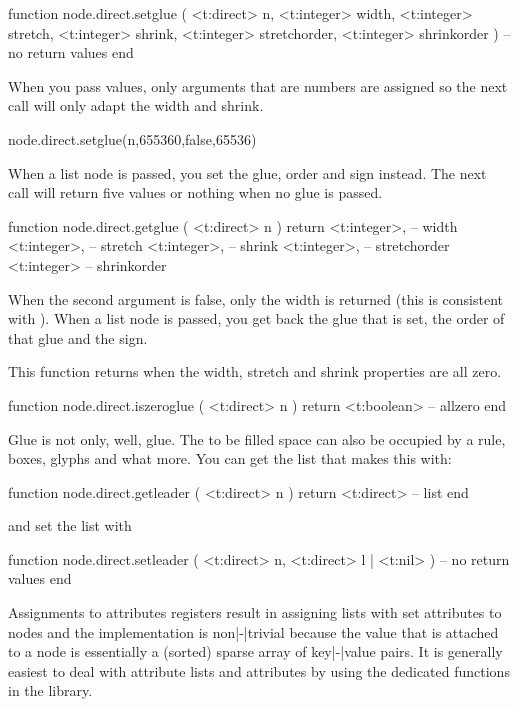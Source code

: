 function node.direct.setglue (
    <t:direct>  n,
    <t:integer> width,
    <t:integer> stretch,
    <t:integer> shrink,
    <t:integer> stretchorder,
    <t:integer> shrinkorder
)
    -- no return values
end
\stoptyping

When you pass values, only arguments that are numbers are assigned so the next
call will only adapt the width and shrink.

\starttyping[option=LUA]
node.direct.setglue(n,655360,false,65536)
\stoptyping


When a list node is passed, you set the glue, order and sign instead. The next
call will return five values or nothing when no glue is passed.

\starttyping[option=LUA]
function node.direct.getglue ( <t:direct> n )
    return
        <t:integer>, -- width
        <t:integer>, -- stretch
        <t:integer>, -- shrink
        <t:integer>, -- stretchorder
        <t:integer>  -- shrinkorder
\stoptyping

When the second argument is false, only the width is returned (this is consistent
with ). When a list node is passed, you get back the glue that is
set, the order of that glue and the sign.

This function returns  when the width, stretch and shrink properties
are all zero.

\starttyping[option=LUA]
function node.direct.iszeroglue ( <t:direct> n )
    return <t:boolean> -- allzero
end
\stoptyping

Glue is not only, well, glue. The to be filled space can also be occupied by a rule,
boxes, glyphs and what more. You can get the list that makes this with:

\starttyping[option=LUA]
function node.direct.getleader ( <t:direct> n )
    return <t:direct> -- list
end
\stoptyping

and set the list with

\starttyping[option=LUA]
function node.direct.setleader ( <t:direct> n, <t:direct> l | <t:nil> )
    -- no return values
end
\stoptyping

\stopsubsection

\startsubsection[title={Attributes}]

Assignments to attributes registers result in assigning lists with set attributes
to nodes and the implementation is non|-|trivial because the value that is
attached to a node is essentially a (sorted) sparse array of key|-|value pairs.
It is generally easiest to deal with attribute lists and attributes by using the
dedicated functions in the  library.

